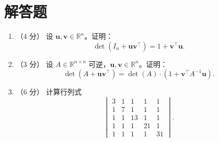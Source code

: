 \documentclass[10pt,a4paper]{exam-zh}
\newcommand{\bvec}[1]{\boldsymbol{#1}}
\newcommand{\R}{\mathbb{R}}
\begin{document}
\section{解答题}

\begin{problem}[points = 13]

\begin{enumerate}
    \item （4 分） 设 $\bvec{u}, \bvec{v} \in \R^n$。证明：
    \[
    \det(I_n + \bvec{u}\bvec{v}^\top) = 1 + \bvec{v}^\top\bvec{u}.
    \]

    \item （3 分） 设 $A \in \R^{n \times n}$ 可逆，$\bvec{u}, \bvec{v} \in \R^n$。证明：
    \[
    \det(A + \bvec{u}\bvec{v}^\top) = \det(A) \cdot (1 + \bvec{v}^\top A^{-1}\bvec{u}).
    \]

    \item （6 分） 计算行列式
    \[
    \begin{vmatrix}
    3   & 1 & 1  & 1  & 1 \\
    1   & 7 & 1  & 1  & 1 \\
    1   & 1 & 13 & 1  & 1 \\
    1   & 1 & 1  & 21 & 1 \\
    1   & 1 & 1  & 1  & 31
    \end{vmatrix}.
    \]
\end{enumerate}
\end{problem}
\end{document}
